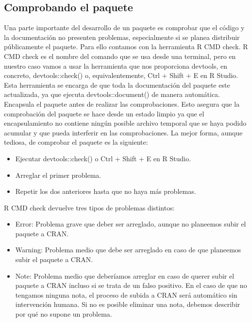 \subsection{Comprobando el paquete}

Una parte importante del desarrollo de un paquete es comprobar que el c\'odigo y la
documentaci\'on no presenten problemas, especialmente si se planea distribuir p\'ublicamente
el paquete. Para ello contamos con la herramienta R CMD check.
R CMD check es el nombre del comando que se usa desde una terminal, pero en nuestro
caso vamos a usar la herramienta que nos proporciona devtools, en concreto,
devtools::check() o, equivalentemente, Ctrl + Shift + E en R Studio.
Esta herramienta se encarga de que toda la documentaci\'on del paquete este actualizada, ya
que ejecuta devtools::document() de manera autom\'atica.
Encapsula el paquete antes de realizar las comprobaciones. Esto asegura que la
comprobaci\'on del paquete se hace desde un estado limpio ya que el encapsulamiento no
contiene ning\'un posible archivo temporal que se haya podido acumular y que pueda interferir
en las comprobaciones.
La mejor forma, aunque tediosa, de comprobar el paquete es la siguiente:

\begin{itemize}
    \item Ejecutar devtools::check() o Ctrl + Shift + E en R Studio.
    \item Arreglar el primer problema.
    \item Repetir los dos anteriores hasta que no haya m\'as problemas.
\end{itemize}

R CMD check devuelve tres tipos de problemas distintos:

\begin{itemize}
    \item Error: Problema grave que deber ser arreglado, aunque no planeemos subir el
paquete a CRAN.
    \item Warning: Problema medio que debe ser arreglado en caso de que planeemos subir
el paquete a CRAN.
    \item Note: Problema medio que deber\'iamos arreglar en caso de querer subir el paquete a
CRAN incluso si se trata de un falso positivo. En el caso de que no tengamos ninguna
nota, el proceso de subida a CRAN ser\'a autom\'atico sin intervenci\'on humana. Si no
es posible eliminar una nota, debemos describir por qu\'e no supone un problema.
\end{itemize}


